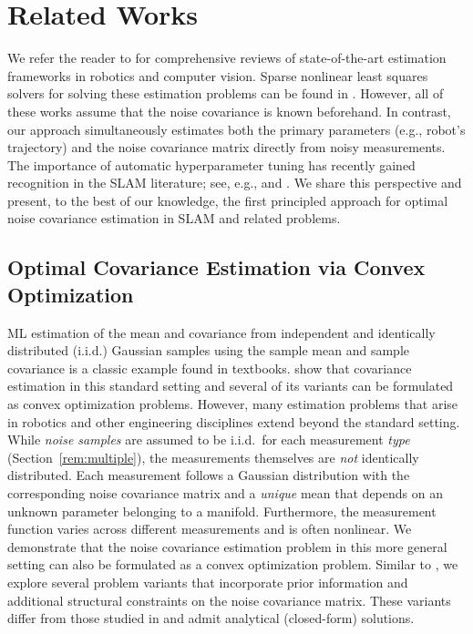 \section{Related Works}
\label{sec:related}
We refer the reader to
\cite{cadena2016simultaneous,dellaert2017factor,ebadi2023present,triggs1999bundle}
for comprehensive reviews of state-of-the-art estimation frameworks in robotics
and computer vision. Sparse nonlinear least squares solvers for
solving these estimation problems can
be found in \cite{Agarwal_Ceres_Solver_2022,gtsam,kuemmerle2011g2o}.
However, all of these works assume that the noise covariance is known
beforehand. In contrast, our approach simultaneously estimates both the primary
parameters (e.g., robot's trajectory) and the noise covariance matrix
directly from noisy measurements.
The importance of automatic hyperparameter tuning has recently gained
recognition in the SLAM literature; see, e.g., \cite[Section V]{ebadi2023present}
and \cite{fontan2024look,fontan2024anyfeature}. We share this perspective and
present, to the best of our knowledge, the first principled
approach for optimal noise covariance estimation in SLAM and related
problems.


\subsection{Optimal Covariance Estimation via Convex Optimization}
ML estimation of the mean and covariance from independent and identically
distributed (i.i.d.) Gaussian samples using the sample mean and sample
covariance is a classic example found in textbooks.
\citet[Chapter 7.1.1]{boyd2004convex} show that covariance
estimation in this standard setting and several of its variants can be formulated as convex optimization
problems.
However, many estimation problems that arise in robotics and other engineering disciplines extend
beyond the standard setting.
While \emph{noise samples} are assumed to be i.i.d.\ for each
measurement \emph{type} (Section~\ref{rem:multiple}), the measurements
themselves are \emph{not} identically distributed. Each measurement follows a Gaussian
distribution with the corresponding noise covariance matrix and a \emph{unique} mean that depends on an
unknown parameter belonging to a manifold.
Furthermore, the measurement function varies across different measurements and
is often nonlinear. 
We demonstrate that the noise covariance estimation problem in this
more general setting can also be formulated as a convex optimization problem. Similar to
\cite{boyd2004convex}, we explore several problem variants that incorporate
prior information and additional structural constraints on the noise covariance
matrix. These variants differ from those studied in
\cite[Chapter 7.1.1]{boyd2004convex} and admit analytical (closed-form)
solutions.

